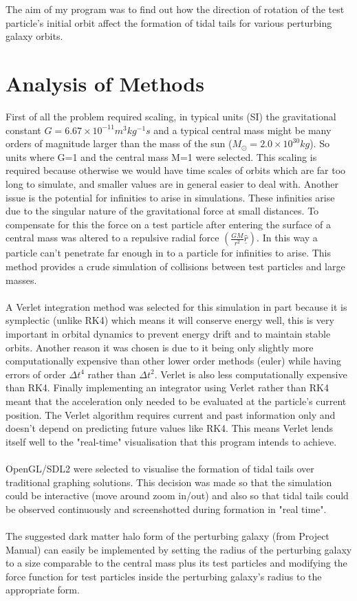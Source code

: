 \documentclass[10pt,a4paper]{article}
\begin{document}
\\
\\
The aim of my program was to find out how the direction of rotation of the test particle's initial orbit affect the formation of tidal tails for various perturbing galaxy orbits.

\clearpage
\section{Analysis of Methods}
First of all the problem required scaling, in typical units (SI) the gravitational constant $G=6.67\times10^{-11} m^3 kg^{-1} s$ and a typical central mass might be many orders of magnitude larger than the mass of the sun ($M_\odot=2.0\times10^{30 } kg$). So units where G=1 and the central mass M=1 were selected. This scaling is required because otherwise we would have time scales of orbits which are far too long to simulate, and smaller values are in general easier to deal with. Another issue is the potential for infinities to arise in simulations. These infinities arise due to the singular nature of the gravitational force at small distances. To compensate for this the force on a test particle after entering the surface of a central mass was altered to a repulsive radial force $(\frac{GM}{r^2} \underline{\hat{r}})$. In this way a particle can't penetrate far enough in to a particle for infinities to arise. This method provides a crude simulation of collisions between test particles and large masses.
\\
\\
A Verlet integration method was selected for this simulation in part because it is symplectic (unlike RK4) which means it will conserve energy well, this is very important in orbital dynamics to prevent energy drift and to maintain stable orbits. Another reason it was chosen is due to it being only slightly more computationally expensive than other lower order methods (euler) while having errors of order $\Delta t^4$ rather than $\Delta t^2$. Verlet is also less computationally expensive than RK4. Finally implementing an integrator using Verlet rather than RK4 meant that the acceleration only needed to be evaluated at the particle's current position. The Verlet algorithm requires current and past information only and doesn't depend on predicting future values like RK4. This means Verlet lends itself well to the "real-time" visualisation that this program intends to achieve.
\\
\\
OpenGL/SDL2 were selected to visualise the formation of tidal tails over traditional graphing solutions. This decision was made so that the simulation could be interactive (move around zoom in/out) and also so that tidal tails could be observed continuously and screenshotted during formation in "real time".
\\
\\
The suggested dark matter halo form of the perturbing galaxy (from Project Manual) can easily be implemented by setting the radius of the perturbing galaxy to a size comparable to the central mass plus its test particles and modifying the force function for test particles inside the perturbing galaxy's radius to the appropriate form.
\clearpage
\end{document}
